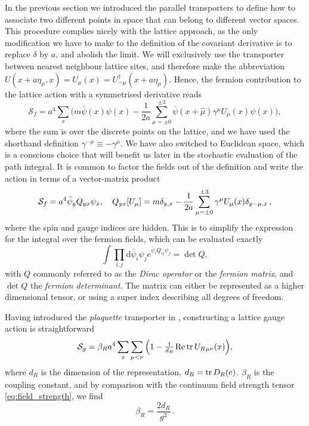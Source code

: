 In the previous section we introduced the parallel transporters to define how to
associate two different points in space that can belong to different vector
spaces. This procedure complies nicely with the lattice approach, as the only modification we
have to make to the definition of the covariant derivative is to
replace $\delta$ by $a$, and abolish the limit. We will exclusively use the
transporter between nearest neighbour lattice sites, and therefore make the
abbreviation $U(x + a \eta_\mu, x) = U_{\mu}(x) =
U_{-\mu}^{\dagger}(x+a\eta_{\mu})$. Hence, the fermion contribution to the
lattice action with a symmetrised derivative reads
%
\begin{equation} \label{eq:naive_fermions}
  \mathcal{S}_f = a^4 \sum_x \Big( 
    m \bar{\psi}(x)\psi(x) - 
    \frac{1}{2a}\sum_{\mu=\pm 0}^{\pm 3}
    \bar{\psi}(x+\hat{\mu})\gamma^{\mu}U_{\mu}(x) \psi(x) \bigg),
\end{equation}
%
where the sum is over the discrete points on the lattice, and we have used the
shorthand definition $\gamma^{-\mu} \equiv -\gamma^{\mu}$. We have also switched
to Euclidean space, which is a conscious choice that will benefit us later in
the stochastic evaluation of the path integral. It is common to factor the
fields out of the definition and write the action in terms of a vector-matrix
product
%
\begin{equation} \label{eq:quark_mat_def}
  \mathcal{S}_f = a^4 \bar{\psi}_y Q_{yx} \psi_x, \hskip1em 
  Q_{yx}[U_{\mu}] = m \delta_{y,x} - \frac{1}{2a} \sum_{\mu=\pm 0}^{\pm 3} \gamma^{\mu}
    U_{\mu}(x) \delta_{y-\mu,x} \,,
\end{equation}
%
where the spin and gauge indices are hidden.  This is to simplify the expression
for the integral over the fermion fields, which can be evaluated exactly
%
\begin{equation} \label{eq:fermion-integral}
  \int \prod_{i,j} \mathrm{d} \bar{\psi}_i \psi_j e^{\bar{\psi}_i Q_{ij} \psi_j}
   = \det Q,
\end{equation}
%
with $Q$ commonly referred to as the \emph{Dirac operator} or the \emph{fermion
  matrix}, and $\det Q$ the \emph{fermion determinant}. The matrix can either be
represented as a higher dimensional tensor, or using a super index describing all
degrees of freedom.

Having introduced the \emph{plaquette} transporter in
, constructing a lattice gauge action is
straightforward
%
\begin{equation}
  \mathcal{S}_g = \beta_R a^4 \sum_x \sum_{\mu < \nu} \Big( 1 -
    \textstyle\frac{1}{d_R} \hskip.2ex \text{Re} \operatorname{tr} U_{R \hskip.2ex\mu\nu}(x) \Big),
\end{equation}
%
where $d_R$ is the dimension of the representation, $d_R = \operatorname{tr} D_R(e)$. $\beta_R$ is the
coupling constant, and by comparison with the continuum field strength tensor
\eqref{eq:field_strength}, we find
%
\begin{equation}
  \beta_R = \frac{2 d_R}{g^2} \,.
\end{equation}

